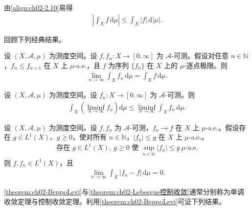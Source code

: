 \documentclass[../../main.tex]{subfiles}%
\begin{document}
由\eqref{align:ch02-2.10}易得
\begin{align}
\left|\int_X f\,\mathrm{d}\mu\right|\leqslant\int_X|f|\,\mathrm{d}|\mu|. \label{align:ch02-2.11}
\end{align}

回顾下列经典结果。

\begin{theorem}\label{theorem:ch02-BeppoLevi}\label{corollary:ch02-平均收敛}
设 $(X,\mathscr A,\mu)$ 为测度空间。设 $f,f_n:X\to[0,\infty]$ 为 $\mathscr A$-可测。假设对任意 $n\in\mathbb N$，$f_n\leqslant f_{n+1}$ 在 $X$ 上 $\mu$-a.e.，且 $f$ 为序列 $\{f_n\}$ 在 $X$ 上的 $\mu$-逐点极限。则
\begin{align*}
\lim_{n\to\infty}\int_X f_n\,\mathrm{d}\mu=\int_X f\,\mathrm{d}\mu.
\end{align*}
\end{theorem}

\begin{theorem}[Fatou]\label{theorem:ch02-Fatou}
设 $(X,\mathscr A,\mu)$ 为测度空间。设 $f_n:X\to[0,\infty]$ 为 $\mathscr A$-可测。则
\begin{align*}
\int_X\left(\liminf_{n\to\infty}f_n\right)\mathrm{d}\mu\leqslant\liminf_{n\to\infty}\int_X f_n\,\mathrm{d}\mu.
\end{align*}
\end{theorem}

\begin{theorem}\label{theorem:ch02-Lebesgue控制收敛}\label{corollary:ch02-控制收敛}
设 $(X,\mathscr A,\mu)$ 为测度空间。设 $f,f_n$ 为 $\mathscr A$-可测，$f_n\to f$ 在 $X$ 上 $\mu$-a.e.。假设存在 $g\in L^1(X)$、$g\geqslant0$，使对所有 $n\in\mathbb N$，$|f_n|\leqslant g$ 在 $X$ 上 $\mu$-a.e.。
\begin{align}
\text{存在 }g\in L^1(X),\ g\geqslant0\text{ 使 }\sup_{n\in\mathbb N}|f_n|\leqslant g\ \mu\text{-a.e.} \label{align:ch02-2.12}
\end{align}
则 $f,f_n\in L^1(X)$，且
\begin{align*}
\lim_{n\to\infty}\int_X|f_n-f|\,\mathrm{d}\mu=0.
\end{align*}
\end{theorem}

\cref{theorem:ch02-BeppoLevi}与\cref{theorem:ch02-Lebesgue控制收敛}通常分别称为单调收敛定理与控制收敛定理。利用\cref{theorem:ch02-BeppoLevi}可证下列结果。
\end{document}
